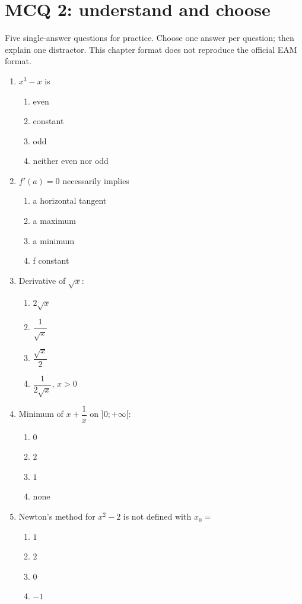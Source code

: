 \endgroup
\begingroup\small
{}\section*{MCQ 2: understand and choose}\label{C06-Q2}
Five single-answer questions for practice. Choose one answer per question; then explain one distractor. This chapter format does not reproduce the official EAM format.
\begin{enumerate}
\item $x^3-x$ is
\begin{enumerate}[label=\Alph*.,itemsep=2pt]
\item even
\item constant
\item odd
\item neither even nor odd
\end{enumerate}
\item $f\prime(a)=0$ necessarily implies
\begin{enumerate}[label=\Alph*.,itemsep=2pt]
\item a horizontal tangent
\item a maximum
\item a minimum
\item f constant
\end{enumerate}
\item Derivative of $\sqrt x$:
\begin{enumerate}[label=\Alph*.,itemsep=2pt]
\item $2\sqrt x$
\item $\dfrac{1}{\sqrt x}$
\item $\dfrac{\sqrt x}{2}$
\item $\dfrac{1}{2\sqrt x}$, $x>0$
\end{enumerate}
\item Minimum of $x+\dfrac{1}{x}$ on $]0;+\infty[$:
\begin{enumerate}[label=\Alph*.,itemsep=2pt]
\item $0$
\item $2$
\item $1$
\item none
\end{enumerate}
\item Newton's method for $x^2-2$ is not defined with $x_0=$
\begin{enumerate}[label=\Alph*.,itemsep=2pt]
\item $1$
\item $2$
\item $0$
\item $-1$
\end{enumerate}
\end{enumerate}
